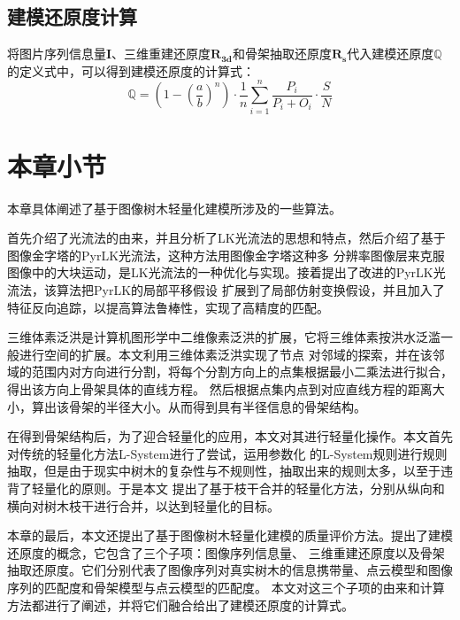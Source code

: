 \subsection{建模还原度计算}
将图片序列信息量$\mathbf{I}$、三维重建还原度$\mathbf{R_{3d}}$和骨架抽取还原度$\mathbf{R_s}$代入建模还原度$\mathbb{Q}$
的定义式中，可以得到建模还原度的计算式：\\
\begin{equation}
	\mathbb{Q}= (1-(\frac{a}{b})^n)\cdot \frac{1}{n}\sum_{i=1}^n \frac{P_i}{P_i+O_i} \cdot \frac{S}{N}
\end{equation}

\section{本章小节}
\label{sec:conclusion}
本章具体阐述了基于图像树木轻量化建模所涉及的一些算法。

首先介绍了光流法的由来，并且分析了LK光流法的思想和特点，然后介绍了基于图像金字塔的PyrLK光流法，这种方法用图像金字塔这种多
分辨率图像层来克服图像中的大块运动，是LK光流法的一种优化与实现。接着提出了改进的PyrLK光流法，该算法把PyrLK的局部平移假设
扩展到了局部仿射变换假设，并且加入了特征反向追踪，以提高算法鲁棒性，实现了高精度的匹配。

三维体素泛洪是计算机图形学中二维像素泛洪的扩展，它将三维体素按洪水泛滥一般进行空间的扩展。本文利用三维体素泛洪实现了节点
对邻域的探索，并在该邻域的范围内对方向进行分割，将每个分割方向上的点集根据最小二乘法进行拟合，得出该方向上骨架具体的直线方程。
然后根据点集内点到对应直线方程的距离大小，算出该骨架的半径大小。从而得到具有半径信息的骨架结构。

在得到骨架结构后，为了迎合轻量化的应用，本文对其进行轻量化操作。本文首先对传统的轻量化方法L-System进行了尝试，运用参数化
的L-System规则进行规则抽取，但是由于现实中树木的复杂性与不规则性，抽取出来的规则太多，以至于违背了轻量化的原则。于是本文
提出了基于枝干合并的轻量化方法，分别从纵向和横向对树木枝干进行合并，以达到轻量化的目标。

本章的最后，本文还提出了基于图像树木轻量化建模的质量评价方法。提出了建模还原度的概念，它包含了三个子项：图像序列信息量、
三维重建还原度以及骨架抽取还原度。它们分别代表了图像序列对真实树木的信息携带量、点云模型和图像序列的匹配度和骨架模型与点云模型的匹配度。
本文对这三个子项的由来和计算方法都进行了阐述，并将它们融合给出了建模还原度的计算式。
